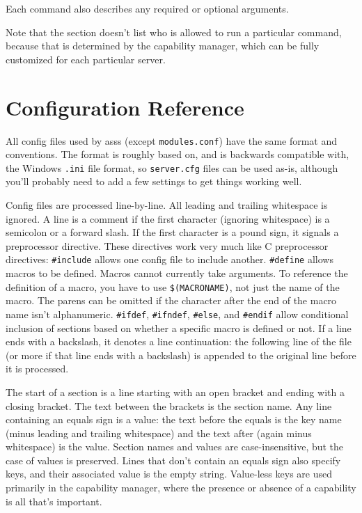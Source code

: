 \documentclass{article}
\newcommand{\asss}{asss}
\begin{document}
Each command also describes any required or optional arguments.

Note that the section doesn't list who is allowed to run a particular
command, because that is determined by the capability manager, which can
be fully customized for each particular server.




\section{Configuration Reference}

All config files used by \asss{} (except \verb/modules.conf/) have the
same format and conventions. The format is roughly based on, and is
backwards compatible with, the Windows \verb/.ini/ file format, so
\verb/server.cfg/ files can be used as-is, although you'll probably need
to add a few settings to get things working well.

Config files are processed line-by-line. All leading and trailing
whitespace is ignored. A line is a comment if the first character
(ignoring whitespace) is a semicolon or a forward slash. If the first
character is a pound sign, it signals a preprocessor directive. These
directives work very much like C preprocessor directives:
\verb/#include/ allows one config file to include another.
\verb/#define/ allows macros to be defined. Macros cannot currently take
arguments. To reference the definition of a macro, you have to use
\verb/$(MACRONAME)/, not just the name of the macro. The parens can be
omitted if the character after the end of the macro name isn't
alphanumeric. \verb/#ifdef/, \verb/#ifndef/, \verb/#else/, and
\verb/#endif/ allow conditional inclusion of sections based on whether a
specific macro is defined or not. If a line ends with a backslash, it
denotes a line continuation: the following line of the file (or more if
that line ends with a backslash) is appended to the original line before
it is processed.

The start of a section is a line starting with an open bracket and
ending with a closing bracket. The text between the brackets is the
section name. Any line containing an equals sign is a value: the text
before the equals is the key name (minus leading and trailing
whitespace) and the text after (again minus whitespace) is the value.
Section names and values are case-insensitive, but the case of values is
preserved. Lines that don't contain an equals sign also specify keys,
and their associated value is the empty string. Value-less keys are used
primarily in the capability manager, where the presence or absence of a
capability is all that's important.
\end{document}
